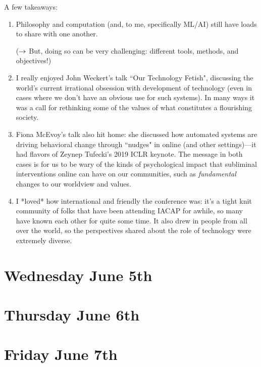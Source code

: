 \documentclass[11pt]{article}
\begin{document}
A few takeaways:
\begin{enumerate}
    \item Philosophy and computation (and, to me, specifically ML/AI) still have loads to share with one another.
    
    ($\rightarrow$ But, doing so can be very challenging: different tools, methods, and objectives!)
    
    \item I really enjoyed John Weckert's talk ``Our Technology Fetish", discussing the world's current irrational obsession with development of technology (even in cases where we don't have an obvious use for such systems). In many ways it was a call for rethinking some of the values of what constitutes a flourishing society.
    
    \item Fiona McEvoy's talk also hit home: she discussed how automated systems are driving behavioral change through ``nudges" in online (and other settings)---it had flavors of Zeynep Tufecki's 2019 ICLR keynote. The message in both cases is for us to be wary of the kinds of psychological impact that subliminal interventions online can have on our communities, such as {\it fundamental} changes to our worldview and values.
    
    \item I *loved* how international and friendly the conference was: it's a tight knit community of folks that have been attending IACAP for awhile, so many have known each other for quite some time. It also drew in people from all over the world, so the perspectives shared about the role of technology were extremely diverse.
\end{enumerate}


\newpage
\section{Wednesday June 5th}




\newpage
\section{Thursday June 6th}




\newpage
\section{Friday June 7th}





\newpage


\end{document}
